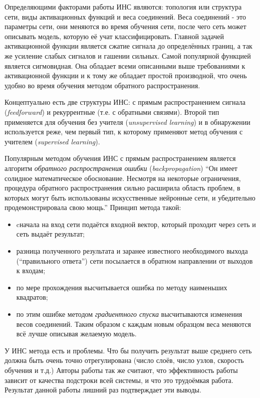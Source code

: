 \documentclass[12pt]{report}
\newenvironment{myItemize}{
 	\vspace{-10pt}
	\begin{itemize}[nolistsep]
}{\end{itemize}}
\begin{document}
Определяющими факторами работы ИНС являются: топология или структура сети, виды активационных функций и веса 
соединений. Веса соединений - это параметры сети, они меняются во время обучения сети, после чего сеть может 
описывать модель, которую её учат классифицировать. Главной задачей активационной функции является сжатие сигнала до 
определённых границ, а так же усиление слабых сигналов и гашении сильных. Самой популярной функцией является 
сигмовидная. Она обладает всеми описанными выше требованиями к активационной функции и к тому же 
обладает простой производной, что очень удобно во время обучения методом обратного распространения. \citep
{wasserman1989neural}

Концептуально есть две структуры ИНС: с прямым распространением сигнала (\textit{feedforward}) и рекуррентные (т.е. с 
обратными связями). Второй тип применяется для обучения без учителя (\textit{unsupervised learning}) и в обнаружении 
используется реже, чем первый тип, к которому применяют метод обучения с учителем (\textit{supervised learning}).

Популярным методом обучения ИНС с прямым распространением является алгоритм \emph{обратного распространения ошибки} 
(\textit{backpropagation}) ``Он имеет солидное математическое обоснование. Несмотря на некоторые ограничения, 
процедура обратного распространения сильно расширила область проблем, в которых могут быть использованы искусственные 
нейронные сети, и убедительно продемонстрировала свою мощь.'' \citep{wasserman1989neural} Принцип метода такой: 
\begin{myItemize}
\item cначала на вход сети подаётся входной вектор, который проходит через сеть и сеть выдаёт результат;
\item разница полученного результата и заранее известного необходимого выхода (``правильного ответа'') сети 
посылается в обратном направлении от выходов к входам;
\item по мере прохождения высчитывается ошибка по методу наименьших квадратов;
\item по этим ошибке методом \emph{градиентного спуска} высчитываются изменения весов соединений. Таким образом с 
каждым новым образцом веса меняются всё лучше описывая желаемую модель.
\end{myItemize}

 У ИНС метода есть и проблемы. Что бы получить результат выше среднего сеть должна быть очень точно отрегулирована 
(число слоёв, число узлов, скорость обучения и т.д.) \citep{jee2004eye} Авторы работы \citep{capi2010vision} так же 
считают, что эффективность работы зависит от качества подстроки всей системы, и что это трудоёмкая работа. Результат 
данной работы лишний раз подтверждает эти выводы.
\end{document}
